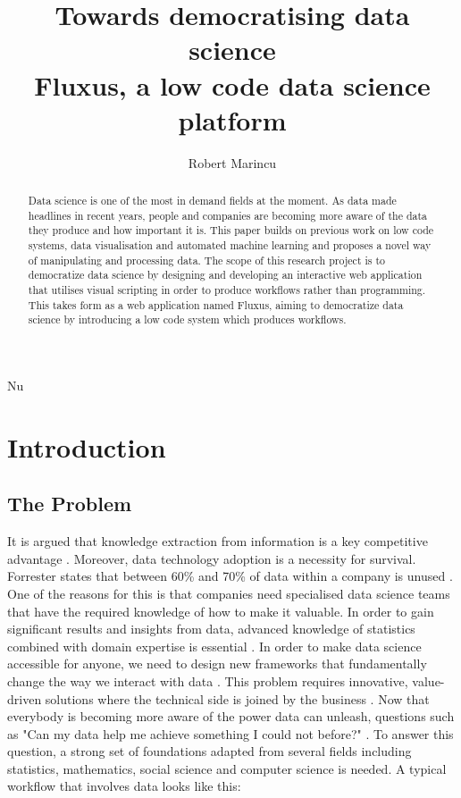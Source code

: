 Nu\documentclass[11pt,twoside, a4paper]{report}
\title{ \huge Towards democratising data science \\
        \LARGE Fluxus, a low code data science platform }
\author{Robert Marincu}
\begin{document}
\maketitle

\tableofcontents

\begin{abstract}
Data science is one of the most in demand fields at the moment. As data made headlines in recent years, people and companies are becoming more aware of the data they produce and how important it is. This paper builds on previous work on low code systems, data visualisation and automated machine learning and proposes a novel way of manipulating and processing data. The scope of this research project is to democratize data science by designing and developing
an interactive web application that utilises visual scripting in order to produce workflows
rather than programming. This takes form as a web application named Fluxus, aiming to democratize data science by introducing a low code system which produces workflows.\\
\end{abstract}

\chapter{Introduction}

\section{The Problem}
It is argued that knowledge extraction from information is a key competitive advantage \cite{McKinsey}.  Moreover, data technology adoption is a necessity for survival. Forrester states that between 60\% and 70\% of data within a company is unused \cite{Gualtieri}. One of the reasons for this is that companies need specialised data science teams that have the required knowledge of how to make it valuable. In order to gain significant results and insights from data, advanced knowledge of statistics combined with domain expertise is essential \cite{ShangZeyuan2019DDSt}. In order to make data science accessible for anyone, we need to design new frameworks that fundamentally change the way we interact with data \cite{KraskaT.2018NAid}.
This problem requires innovative, value-driven solutions where the technical side is joined by the business \cite{Cavanillas2016}.
Now that everybody is becoming more aware of the power data can unleash, questions such as "Can my data help me achieve something I could not before?" \cite{Cao2017}. To answer this question, a strong set of foundations adapted from several fields including statistics, mathematics, social science and computer science is needed. A typical workflow that involves data looks like this:
\end{document}
